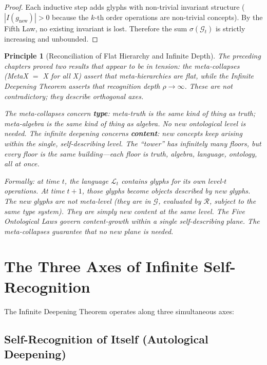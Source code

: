 \documentclass[12pt, letterpaper]{book}
\def\equiv{=}%
\def\mathfrak#1{#1}%
\newtheorem{principle}{Principle}[chapter]
\begin{document}
\begin{proof}
Each inductive step adds glyphs with non-trivial invariant structure ($|I(\mathfrak{g}_{\mathrm{new}})| > 0$ because the $k$-th order operations are non-trivial concepts). By the Fifth Law, no existing invariant is lost. Therefore the sum $\sigma(\mathcal{G}_t)$ is strictly increasing and unbounded.
\end{proof}

\begin{principle}[Reconciliation of Flat Hierarchy and Infinite Depth]
The preceding chapters proved two results that appear to be in tension: the meta-collapses (MetaX $\equiv$ X for all X) assert that meta-hierarchies are \textit{flat}, while the Infinite Deepening Theorem asserts that recognition depth $\rho \to \infty$. These are not contradictory; they describe orthogonal axes.

The meta-collapses concern \textbf{type}: meta-truth is the same \textit{kind} of thing as truth; meta-algebra is the same \textit{kind} of thing as algebra. No new ontological level is needed. The infinite deepening concerns \textbf{content}: new concepts keep arising within the single, self-describing level. The ``tower'' has infinitely many floors, but every floor is the same building---each floor is truth, algebra, language, ontology, all at once.

Formally: at time $t$, the language $\mathcal{L}_t$ contains glyphs for its own level-$t$ operations. At time $t+1$, those glyphs become objects described by new glyphs. The new glyphs are not meta-level (they are in $\mathcal{G}$, evaluated by $\mathcal{R}$, subject to the same type system). They are simply \textit{new content at the same level}. The Five Ontological Laws govern content-growth within a single self-describing plane. The meta-collapses guarantee that no new plane is needed.
\end{principle}

\section{The Three Axes of Infinite Self-Recognition}

The Infinite Deepening Theorem operates along three simultaneous axes:

\subsection{Self-Recognition of Itself (Autological Deepening)}
\end{document}

